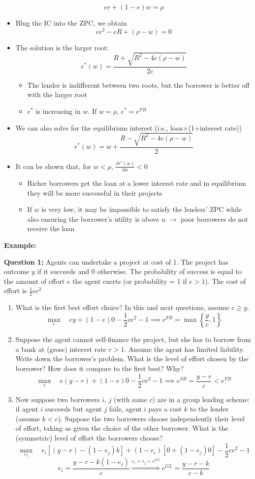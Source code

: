 \documentclass[a4paper]{article}
\begin{document}
\begin{itemize}
    \[er+(1-e)w=\rho \]
    \item Blug the IC into the ZPC, we obtain
    \[ce^2-eR+(\rho-w)=0 \]
    \item The solution is the larger root:
    \[e^*(w)=\frac{R+\sqrt{R^2-4c(\rho-w)}}{2c} \]
    \begin{itemize}
        \item The lender is indifferent between two roots, but the borrower is better off with the larger root
        \item $e^*$ is increasing in $w$. If $w=\rho$, $e^*=e^{FB}$
    \end{itemize}
    \item We can also solve for the equilibrium interest (i.e., loan$\times$(1+interest rate))
    \[r^*(w)=w+\frac{R-\sqrt{R^2-4c(\rho-w)}}{2} \]
    \item It can be shown that, for $w<\rho$, $\frac{\partial r^*(w)}{\partial w}<0$
    \begin{itemize}
        \item Richer borrowers get the loan at a lower interest rate and in equilibrium they will be more successful in their projects
        \item If $w$ is very low, it may be impossible to satisfy the lenders' ZPC while also ensuring the borrower's utility is above $u$ $\to$ poor borrowers do not receive the loan
    \end{itemize}
\end{itemize}

\textbf{Example:}

\textbf{Question 1:} Agents can undertake a project at cost of 1. The project has outcome $y$ if it succeeds and 0 otherwise. The probability of success is equal to the amount of effort $e$ the agent exerts (or probability = 1 if $e>1$). The cost of effort is $\frac{1}{2}ce^2$
\begin{enumerate}
    \item What is the first best effort choice? In this and next questions, assume $c\geq y$.
    \[\max_{e}\quad ey+(1-e)0-\frac{1}{2}ce^2-1 \implies e^{FB}=\max\left\{\frac{y}{c},1\right\} \]
    \item Suppose the agent cannot self-finance the project, but she has to borrow from a bank at (gross) interest rate $r>1$. Assume the agent has limited liability. Write down the borrower’s problem. What is the level of effort chosen by the borrower? How does it compare to the first best? Why?
    \[\max_{e}\quad e(y-r)+(1-e)0-\frac{1}{2}ce^2-1 \implies e^{SB}=\frac{y-r}{c}<e^{FB} \]
    \item Now suppose two borrowers $i$, $j$ (with same $c$) are in a group lending scheme: if agent $i$ succeeds but agent $j$ fails, agent i pays a cost $k$ to the lender (assume $k<c$). Suppose the two borrowers choose independently their level of effort, taking as given the choice of the other borrower. What is the (symmetric) level of effort the borrowers choose?
    \[\max_{e_i}\quad e_i[(y-r)-(1-e_j)k]+(1-e_i)[0+(1-e_j)0]-\frac{1}{2}ce^2-1 \]
    \[e_i=\frac{y-r-k(1-e_j)}{c}\overset{e_i=e_j=e^{GL}}{\Longrightarrow}e^{GL}=\frac{y-r-k}{c-k} \]
\end{enumerate}
\end{document}

